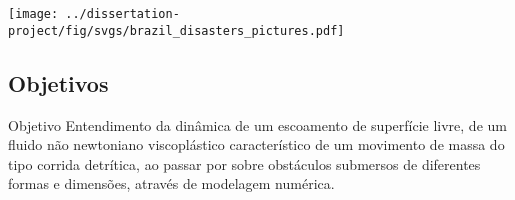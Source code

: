 \begin{frame}
    \begin{minipage}[c]{0.6\textwidth}
        \centering
        \texttt{[image: ../dissertation-project/fig/svgs/brazil\_disasters\_pictures.pdf]}
    \end{minipage}
    \hfill
    \begin{minipage}[c]{0.38\textwidth}
    \end{minipage}
\end{frame}

\subsection{Objetivos}

\begin{frame}
    \begin{exampleblock}{\Large Objetivo}
        \Large
        Entendimento da dinâmica de um escoamento de superfície livre, 
        de um fluido não newtoniano viscoplástico característico de um movimento de massa 
        do tipo corrida detrítica, ao passar por sobre obstáculos submersos de diferentes formas e dimensões, 
        através de modelagem numérica.
    \end{exampleblock}
\end{frame}

